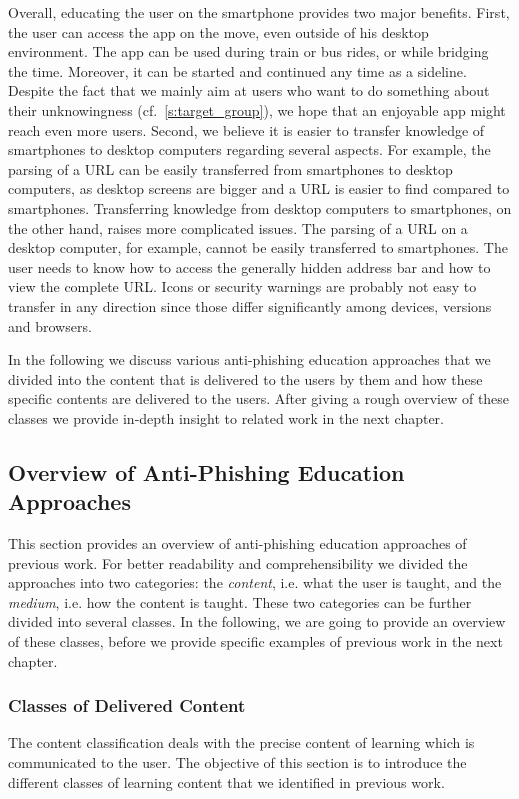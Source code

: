 Overall, educating the user on the smartphone provides two major benefits.
First, the user can access the app on the move, even outside of his desktop environment.
The app can be used during train or bus rides, or while bridging the time.
Moreover, it can be started and continued any time as a sideline.
Despite the fact that we mainly aim at users who want to do something about their unknowingness (cf.~\autoref{s:target_group}), we hope that an enjoyable app might reach even more users.
Second, we believe it is easier to transfer knowledge of smartphones to desktop computers regarding several aspects.
For example, the parsing of a URL can be easily transferred from smartphones to desktop computers, as desktop screens are bigger and a URL is easier to find compared to smartphones.
Transferring knowledge from desktop computers to smartphones, on the other hand, raises more complicated issues.
The parsing of a URL on a desktop computer, for example, cannot be easily transferred to smartphones.
The user needs to know how to access the generally hidden address bar and how to view the complete URL.
Icons or security warnings are probably not easy to transfer in any direction since those differ significantly among devices, versions and browsers.

In the following we discuss various anti-phishing education approaches that we divided into the content that is delivered to the users by them and how these specific contents are delivered to the users.
After giving a rough overview of these classes we provide in-depth insight to related work in the next chapter.

\subsection{Overview of Anti-Phishing Education Approaches}
This section provides an overview of anti-phishing education approaches of previous work.
 For better readability and comprehensibility we divided the approaches into two categories: the \textit{content}, i.e.
 what the user is taught, and the 
\textit{medium}, i.e. how the content is taught.
These two categories can be further divided into several classes. 
In the following, we are going to provide an overview of these classes, before we provide specific examples of previous work in the next chapter.


\subsubsection{Classes of Delivered Content}
\label{s:content_classification}
The content classification deals with the precise content of learning which is communicated to the user. 
The objective of this section is to introduce the different classes of learning content that we identified in previous work.

